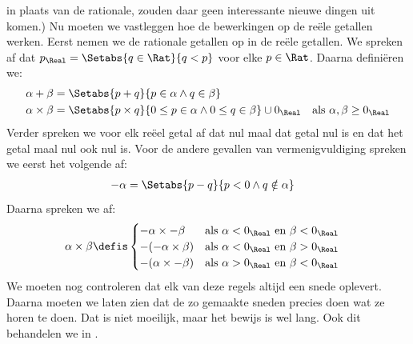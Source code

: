 \documentclass[../../../include/open-logic-section]{subfiles}
\begin{document}
in plaats van de rationale, zouden daar geen interessante nieuwe
dingen uit komen.)
Nu moeten we vastleggen hoe de bewerkingen op de reële getallen werken.
Eerst nemen we de rationale getallen op in de reële getallen. We
spreken af dat $p_\Real = \Setabs{q \in \Rat}{q < p}$ voor elke
$p \in \Rat$. Daarna definiëren we:
\begin{align*}
	\alpha + \beta &= \Setabs{p + q}{p \in \alpha \land q \in \beta}\\
	\alpha \times \beta &=
	\Setabs{p \times q}{0 \leq p \in \alpha \land 0 \leq q \in \beta} \cup 0_\Real & \text{als }\alpha, \beta \geq 0_\Real
\end{align*}
Verder spreken we voor elk reëel getal af dat nul maal dat getal nul
is en dat het getal maal nul ook nul is. Voor de andere gevallen van
vermenigvuldiging spreken we eerst het volgende af:
\begin{align*}
	-\alpha &= \Setabs{p - q}{p < 0 \land q \notin \alpha}
\end{align*}
Daarna spreken we af:
\begin{align*}
	\alpha \times \beta &\defis
	\begin{cases}
		\mathord{-}\alpha \times \mathord{-}\beta &\text{als }\alpha < 0_\Real\text{ en }\beta < 0_\Real\\
		\mathord{-}(\mathord{-}\alpha \times \beta) &\text{als }\alpha < 0_\Real \text{ en }\beta > 0_\Real\\
		\mathord{-}(\alpha \times \mathord{-}\beta) &\text{als }\alpha > 0_\Real \text{ en }\beta < 0_\Real
	\end{cases}
\end{align*}
We moeten nog controleren dat elk van deze regels altijd een snede
oplevert. Daarna moeten we laten zien dat de zo gemaakte sneden precies
doen wat ze horen te doen. Dat is niet moeilijk, maar het bewijs is wel
lang. Ook dit behandelen we in .
\end{document}
